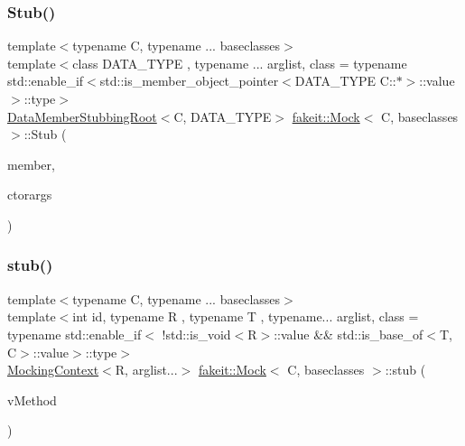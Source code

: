 \mbox{\label{classfakeit_1_1Mock_ae210824251ca071933f8a651bbe56047}} 
\subsubsection{\texorpdfstring{Stub()}{Stub()}\hspace{0.1cm}{\footnotesize\ttfamily [4/9]}}
{\footnotesize\ttfamily template$<$typename C, typename ... baseclasses$>$ \\
template$<$class D\+A\+T\+A\+\_\+\+T\+Y\+PE , typename ... arglist, class  = typename std\+::enable\+\_\+if$<$std\+::is\+\_\+member\+\_\+object\+\_\+pointer$<$\+D\+A\+T\+A\+\_\+\+T\+Y\+P\+E C\+::$\ast$$>$\+::value$>$\+::type$>$ \\
\mbox{\hyperlink{classfakeit_1_1DataMemberStubbingRoot}{Data\+Member\+Stubbing\+Root}}$<$C, D\+A\+T\+A\+\_\+\+T\+Y\+PE$>$ \mbox{\hyperlink{classfakeit_1_1Mock}{fakeit\+::\+Mock}}$<$ C, baseclasses $>$\+::Stub (\begin{DoxyParamCaption}\item[{D\+A\+T\+A\+\_\+\+T\+Y\+PE C\+::$\ast$}]{member,  }\item[{const arglist \&...}]{ctorargs }\end{DoxyParamCaption})\hspace{0.3cm}{\ttfamily [inline]}}

\mbox{\label{classfakeit_1_1Mock_a6974858200b57469de78bf2a06d6fa02}} 
\subsubsection{\texorpdfstring{stub()}{stub()}\hspace{0.1cm}{\footnotesize\ttfamily [10/72]}}
{\footnotesize\ttfamily template$<$typename C, typename ... baseclasses$>$ \\
template$<$int id, typename R , typename T , typename... arglist, class  = typename std\+::enable\+\_\+if$<$                !std\+::is\+\_\+void$<$\+R$>$\+::value \&\& std\+::is\+\_\+base\+\_\+of$<$\+T, C$>$\+::value$>$\+::type$>$ \\
\mbox{\hyperlink{classfakeit_1_1MockingContext}{Mocking\+Context}}$<$R, arglist...$>$ \mbox{\hyperlink{classfakeit_1_1Mock}{fakeit\+::\+Mock}}$<$ C, baseclasses $>$\+::stub (\begin{DoxyParamCaption}\item[{R(T\+::$\ast$)(arglist...) volatile}]{v\+Method }\end{DoxyParamCaption})\hspace{0.3cm}{\ttfamily [inline]}}

